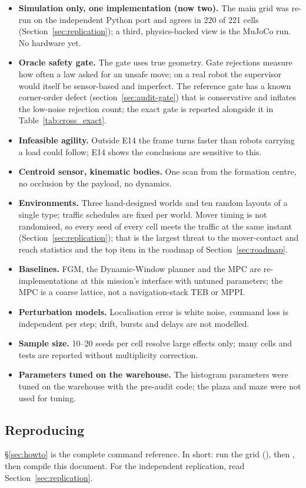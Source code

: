 \begin{itemize}[leftmargin=1.6em]
\item \textbf{Simulation only, one implementation (now two).} The main
grid was re-run on the independent Python port and agrees in 220 of 221
cells (Section~\ref{sec:replication}); a third, physics-backed view is the
MuJoCo run. No hardware yet.
\item \textbf{Oracle safety gate.} The gate uses true geometry. Gate
rejections measure how often a law asked for an unsafe move; on a real
robot the supervisor would itself be sensor-based and imperfect. The
reference gate has a known corner-order defect (section~\ref{sec:audit-gate})
that is conservative and inflates the low-noise rejection count; the
exact gate is reported alongside it in Table~\ref{tab:cross_exact}.
\item \textbf{Infeasible agility.} Outside E14 the frame turns faster than
robots carrying a load could follow; E14 shows the conclusions are
sensitive to this.
\item \textbf{Centroid sensor, kinematic bodies.} One scan from the
formation centre, no occlusion by the payload, no dynamics.
\item \textbf{Environments.} Three hand-designed worlds and ten random
layouts of a single type; traffic schedules are fixed per world. Mover
timing is not randomised, so every seed of every cell meets the traffic at
the same instant (Section~\ref{sec:replication}); that is the largest
threat to the mover-contact and reach statistics and the top item in the
roadmap of Section~\ref{sec:roadmap}.
\item \textbf{Baselines.} FGM, the Dynamic-Window planner and the MPC are
re-implementations at this mission's interface with untuned parameters;
the MPC is a coarse lattice, not a navigation-stack TEB or MPPI.
\item \textbf{Perturbation models.} Localisation error is white noise,
command loss is independent per step; drift, bursts and delays are not
modelled.
\item \textbf{Sample size.} 10--20 seeds per cell resolve large effects
only; many cells and tests are reported without multiplicity correction.
\item \textbf{Parameters tuned on the warehouse.} The histogram parameters
were tuned on the warehouse with the pre-audit code; the plaza and maze
were not used for tuning.
\end{itemize}

\subsection{Reproducing}

\S\ref{sec:howto} is the complete command reference. In short: run the
grid (), then
, then compile this document.
For the independent replication, read Section~\ref{sec:replication}.
